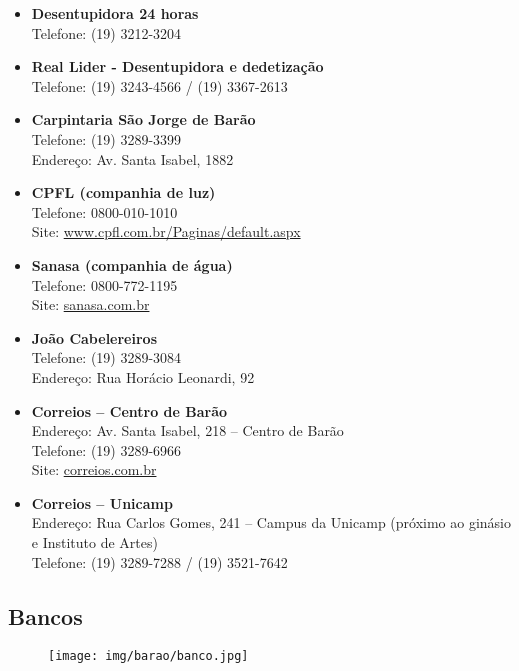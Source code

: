\begin{itemize}
\item \textbf{Desentupidora 24 horas}
  \\Telefone: (19) 3212-3204

\item \textbf{Real Lider - Desentupidora e dedetização}
  \\Telefone: (19) 3243-4566 / (19) 3367-2613

\item \textbf{Carpintaria São Jorge de Barão}
  \\Telefone: (19) 3289-3399
  \\Endereço: Av. Santa Isabel, 1882

\item \textbf{CPFL (companhia de luz)}
  \\Telefone: 0800-010-1010
  \\Site: \url{www.cpfl.com.br/Paginas/default.aspx}

\item \textbf{Sanasa (companhia de água)}
  \\Telefone: 0800-772-1195
  \\Site: \url{sanasa.com.br}

\item \textbf{João Cabelereiros}
  \\Telefone: (19) 3289-3084
  \\Endereço: Rua Horácio Leonardi, 92

\item \textbf{Correios -- Centro de Barão}
  \\Endereço: Av. Santa Isabel, 218 -- Centro de Barão
  \\Telefone: (19) 3289-6966
  \\Site: \url{correios.com.br}

\item \textbf{Correios -- Unicamp}
  \\Endereço: Rua Carlos Gomes, 241 -- Campus da Unicamp (próximo ao
  ginásio e Instituto de Artes)
  \\Telefone: (19) 3289-7288 / (19) 3521-7642
\end{itemize}

\subsection{Bancos}

\begin{figure}[h!]
  \centering
  \texttt{[image: img/barao/banco.jpg]}
\end{figure}


